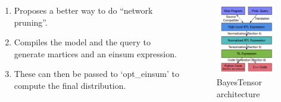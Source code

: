 \documentclass{beamer}
\begin{document}
\begin{frame}
	\frametitle{}
	\begin{columns}
		\begin{column}{0.5\textwidth}
			\begin{enumerate}
				\item Proposes a better way to do ``network pruning''.
				\item Compiles the model and the query to generate martices and an einsum expression.
				\item These can then be passed to `opt\_einsum' to compute the final distribution.
			\end{enumerate}
		\end{column}
		\begin{column}{0.5\textwidth}
			\begin{figure}
				\includegraphics[scale=0.65]{imgs/bayes_tensor.png}
				\caption*{BayesTensor architecture}
			\end{figure}
		\end{column}
	\end{columns}
\end{frame}
\end{document}
